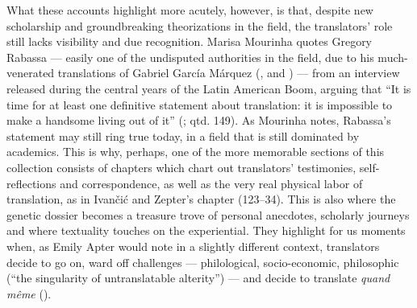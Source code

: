 \begin{review}
What these accounts highlight more acutely, however, is that, despite
new scholarship and groundbreaking theorizations in the field, the
translators' role still lacks visibility and due recognition. Marisa
Mourinha quotes Gregory Rabassa –– easily one of the undisputed
authorities in the field, due to his much-venerated translations of
Gabriel García Márquez (\citeyear{marquez_one_1970}, \citeyear{marquez_autumn_1975} and \citeyear{marquez_chronicle_1983}) –– from an interview
released during the central years of the Latin American Boom, arguing
that ``It is time for at least one definitive statement about
translation: it is impossible to make a handsome living out of it''
(; qtd. 149). As Mourinha notes, Rabassa's statement may
still ring true today, in a field that is still dominated by academics.
This is why, perhaps, one of the more memorable sections of this
collection consists of chapters which chart out translators'
testimonies, self-reflections and correspondence, as well as the very
real physical labor of translation, as in Ivančić and Zepter's chapter
(123--34). This is also where the genetic dossier becomes a treasure
trove of personal anecdotes, scholarly journeys and where textuality
touches on the experiential. They highlight for us moments when, as
Emily Apter would note in a slightly different context, translators
decide to go on, ward off challenges –– philological, socio-economic,
philosophic (``the singularity of untranslatable alterity'') –– and
decide to translate \emph{quand même} ().


\begin{flushleft}
    \renewcommand*{\mkbibnamefamily}[1]{\textsc{#1}}
    \renewcommand*{\mkbibnamegiven}[1]{\textsc{#1}} 
\printbibliography
\end{flushleft}

\end{review}